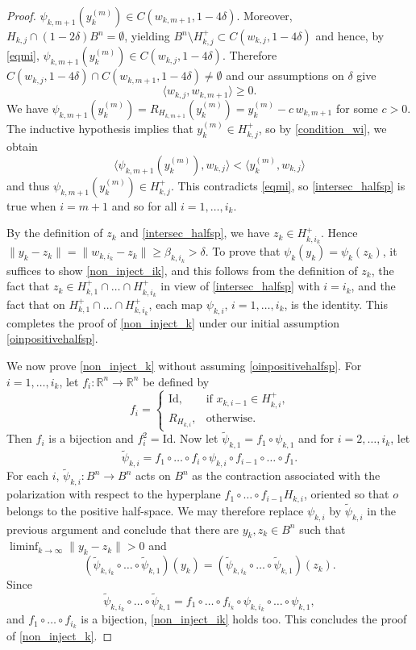 \documentclass[12pt,reqno]{amsart}
\newcommand{\R}{{\mathbb R}}
\newcommand{\Id}{{\mathrm{Id}}}
\numberwithin{equation}{section}
\begin{document}
\begin{proof}
$\psi_{k,m+1}(y_k^{(m)})\in C(w_{k,m+1}, 1-4\delta)$.
Moreover, $H_{k,j}\cap(1-2\delta) B^n=\emptyset$, yielding $B^n\setminus H_{k,j}^+\subset C(w_{k,j}, 1-4\delta)$ and hence, by  \eqref{eqmi}, $ \psi_{k,m+1}(y_k^{(m)})\in C(w_{k,j}, 1-4\delta)$. Therefore $C(w_{k,j}, 1-4\delta)\cap C(w_{k,m+1}, 1-4\delta)\neq \emptyset$ and our assumptions on $\delta$ give
\begin{equation}\label{condition_wi}
 \langle w_{k,j}, w_{k,m+1}\rangle \geq 0.
\end{equation}
We have $ \psi_{k,m+1}(y_k^{(m)})=R_{H_{k,m+1}}(y_k^{(m)})= y_k^{(m)}-c\, w_{k,m+1}$ for some $c>0$.  The inductive hypothesis implies that $y_k^{(m)}\in H_{k,j}^+$, so by \eqref{condition_wi}, we obtain
$$\langle \psi_{k,m+1}(y_k^{(m)}), w_{k,j}\rangle< \langle y_k^{(m)}, w_{k,j}\rangle$$
and thus $\psi_{k,m+1}(y_k^{(m)})\in H_{k,j}^+$. This contradicts \eqref{eqmi}, so \eqref{intersec_halfsp} is true when $i=m+1$ and so for all $i=1,\dots, i_k$.

By the definition of $z_k$ and \eqref{intersec_halfsp}, we have $z_k\in H_{k,i_k}^+$.  Hence $\|y_k-z_k\|=\|w_{k,i_k}-z_k\|\ge \beta_{k,i_k}>\delta$.  To prove that $\psi_k(y_k)=\psi_k(z_k)$, it suffices to show \eqref{non_inject_ik}, and this follows from the definition of $z_k$, the fact that $z_k\in H_{k,1}^+\cap \dots \cap H_{k,i_k}^+$ in view of  \eqref{intersec_halfsp} with $i=i_k$, and the fact that on $H_{k,1}^+\cap \dots \cap H_{k,i_k}^+$, each map $\psi_{k,i}$, $i=1, \dots,i_k$, is the identity. This completes the proof of \eqref{non_inject_k} under our initial assumption \eqref{oinpositivehalfsp}.

We now prove \eqref{non_inject_k} without assuming \eqref{oinpositivehalfsp}. For $i=1,\dots,i_k$,  let $f_i:\R^n\to\R^n$ be defined by
\[
f_i=\begin{cases}
\Id, &\text{if $x_{k,i-1}\in H_{k,i}^+$,} \\
R_{H_{k,i}}, &\text{otherwise.}
\end{cases}
\]
Then $f_i$ is a bijection and $f_i^2=\Id$.
Now let $\tilde{\psi}_{k,1}=f_1\circ\psi_{k,1}$ and for $i=2,\dots,i_k$, let
$$\tilde{\psi}_{k,i}=f_1\circ\dots \circ f_{i}\circ\psi_{k,i}\circ f_{i-1}\circ\dots \circ f_1.$$
For each $i$, $\tilde{\psi}_{k,i}: B^n\to B^n$ acts on $B^n$ as the contraction associated with the polarization with respect to the hyperplane $f_1\circ\dots\circ f_{i-1}H_{k,i}$, oriented so that $o$ belongs to the positive half-space. We may therefore replace $\psi_{k,i}$ by $\tilde{\psi}_{k,i}$ in the previous argument and
conclude that there are $y_k, z_k\in B^n$ such that $\liminf_{k\to\infty}\|y_k-z_k\|>0$ and
\[
(\tilde{\psi}_{k,i_k}\circ\dots\circ\tilde{\psi}_{k,1})(y_k)=
(\tilde{\psi}_{k,i_k}\circ\dots\circ\tilde{\psi}_{k,1})(z_k).
\]
Since
\[
\tilde{\psi}_{k,i_k}\circ\dots\circ\tilde{\psi}_{k,1}=f_1\circ\dots\circ f_{i_k}\circ\psi_{k,i_k}\circ\dots\circ\psi_{k,1},
\]
and $f_1\circ\dots\circ f_{i_k}$ is a bijection, \eqref{non_inject_ik} holds too. This concludes the proof of \eqref{non_inject_k}.


\end{proof}
\end{document}

